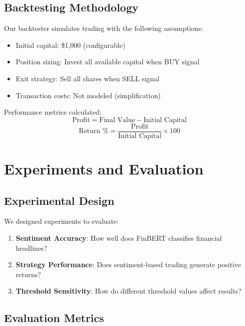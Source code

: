 \documentclass[12pt]{article}
\begin{document}
\subsection{Backtesting Methodology}

Our backtester simulates trading with the following assumptions:
\begin{itemize}
\item Initial capital: \$1,000 (configurable)
\item Position sizing: Invest all available capital when BUY signal
\item Exit strategy: Sell all shares when SELL signal
\item Transaction costs: Not modeled (simplification)
\end{itemize}

Performance metrics calculated:
\begin{equation}
\text{Profit} = \text{Final Value} - \text{Initial Capital}
\end{equation}
\begin{equation}
\text{Return \%} = \frac{\text{Profit}}{\text{Initial Capital}} \times 100
\end{equation}

\section{Experiments and Evaluation}

\subsection{Experimental Design}

We designed experiments to evaluate:
\begin{enumerate}
\item \textbf{Sentiment Accuracy}: How well does FinBERT classifies financial headlines?
\item \textbf{Strategy Performance}: Does sentiment-based trading generate positive returns?
\item \textbf{Threshold Sensitivity}: How do different threshold values affect results?
\end{enumerate}

\subsection{Evaluation Metrics}
\end{document}
